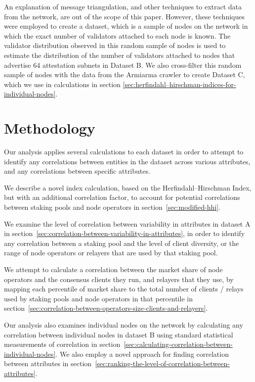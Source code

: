 \documentclass[conference]{IEEEtran}
\begin{document}
An explanation of message triangulation, and other techniques to extract data from the network, are out of the scope of this paper. However, these techniques were employed to create a dataset, which is a sample of nodes on the network in which the exact number of validators attached to each node is known. The validator distribution observed in this random sample of nodes is used to estimate the distribution of the number of validators attached to nodes that advertise 64 attestation subnets in Dataset B. We also cross-filter this random sample of nodes with the data from the Armiarma crawler to create Dataset C, which we use in calculations in section \ref{sec:herfindahl–hirschman-indices-for-individual-nodes}.

\section{Methodology}
\label{sec:methodology}

Our analysis applies several calculations to each dataset in order to attempt to identify any correlations between entities in the dataset across various attributes, and any correlations between specific attributes.

We describe a novel index calculation, based on the Herfindahl–Hirschman Index, but with an additional correlation factor, to account for potential correlations between staking pools and node operators in section~\ref{sec:modified-hhi}.

We examine the level of correlation between variability in attributes in dataset A in section~\ref{sec:correlation-between-variability-in-attributes}, in order to identify any correlation between a staking pool and the level of client diversity, or the range of node operators or relayers that are used by that staking pool.

We attempt to calculate a correlation between the market share of node operators and the consensus clients they run, and relayers that they use, by mapping each percentile of market share to the total number of clients / relays used by staking pools and node operators in that percentile in section~\ref{sec:correlation-between-operators-size-clients-and-relayers}.

Our analysis also examines individual nodes on the network by calculating any correlation between individual nodes in dataset B using standard statistical measurements of correlation in section~\ref{sec:calculating-correlation-between-individual-nodes}.  We also employ a novel approach for finding correlation between attributes in section~\ref{sec:ranking-the-level-of-correlation-between-attributes}.
\end{document}
